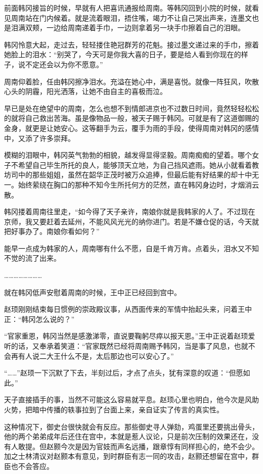 前面韩冈接旨的时候，早就有人把喜讯通报给周南。等韩冈回到小院的时候，就看见周南站在门内候着。就是流着眼泪，捂住嘴，竭力不让自己哭出声来，连墨文也是泪满双颊，一边给周南递着手巾，一边则拿着另一块手巾擦着自己的泪眼。

韩冈怜意大起，走过去，轻轻搂住艳冠群芳的花魁。接过墨文递过来的手巾，擦着她脸上的泪水：“别哭了，今天可是你我大喜的日子，要是给人看到你现在的样子，说不定还会以为你不愿意。”

周南仰着脸，任由韩冈擦净泪水。充溢在她心中，满是喜悦。就像一阵狂风，吹散心头的阴霾，阳光洒落，让她不由自主的喜极而泣。

早已是处在绝望中的周南，怎么也想不到情郎进京也不过数日时间，竟然轻轻松松的就将自己救出苦海。虽是像物品一般，被天子赐于韩冈。可就是有了这道御赐的金身，就更是让她安心。这等翻手为云，覆手为雨的手段，使得周南对韩冈的感情中，又添了许多崇拜。

模糊的泪眼中，韩冈英气勃勃的相貌，越发得显得坚毅。周南痴痴的望着。哪个女子不希望自己毕生所托的良人，能够顶天立地，为自己挡风遮雨。她从小就看着教坊司中的那些姐姐，虽然在韶华正茂时被万众追捧，但最后能有好结果的却十中无一。始终萦绕在胸口的那种不知今生所托何方的茫然，直在韩冈身边时，才烟消云散。

韩冈搂着周南往里走，“如今得了天子亲许，南娘你就是我韩家的人了。不过现在京师，我又要赶着去延州，不能风风光光的纳你进门。若是不嫌仓促的话，今天就把好事办了。南娘你看如何？”

能早一点成为韩家的人，周南哪有什么不愿，自是千肯万肯。点着头，泪水又不知不觉的流了出来。

……………………

就在韩冈低声安慰着周南的时候，王中正已经回到宫中。

赵顼刚刚结束每日惯例的崇政殿议事，从西面传来的军情中抬起头来，问着王中正：“韩冈怎么说的？”

“官家重恩，韩冈当然是感激涕零，直说要鞠躬尽瘁以报天恩。”王中正说着赵顼爱听的话，又奉承着笑道：“官家既然已经将周南赐予韩冈，当是事了风息，也就不会再有人说二大王什么不是，太后那边也可以安心了。”

“……”赵顼一下沉默了下去，半刻过后，才点了点头，犹有深意的叹道：“但愿如此。”

天子直接插手的事，当然不可能这么容易就平息。赵顼心里也明白，他今次是风助火势，把暗中传播的轶事拉到了台面上来，亲自证实了传言的真实性。

这种情况下，御史台很快就会有反应。那些御史寻人弹劾，鸡蛋里还要挑出骨头，他的两个弟弟成年后还住在宫中，本就是惹人议论，只是前次压制的效果还在，没有人敢提。但赵颢今次是因为官妓而声名远播，跟章惇有同样担心的，绝不会少。加之士林清议对赵颢本有意见，到时群臣有志一同的攻击，赵颢还想留在宫中，群臣也不会答应。

